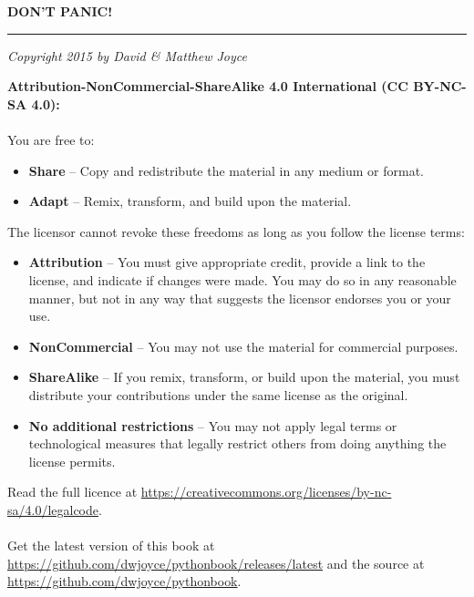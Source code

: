 {
\vspace*{\fill}
\begin{center}
\textbf{\fontsize{50}{50}\selectfont DON'T PANIC!}\\
\hfill\vspace{15pt}
\rule{\linewidth}{1.0mm}\hfill
\vspace{35pt}
\textit{Copyright} \textcopyright\; \textit{2015 by David \& Matthew Joyce}\\
\vspace{20pt}
\end{center}
{\bfseries Attribution-NonCommercial-ShareAlike 4.0 International (CC BY-NC-SA 4.0):}\\~\\
\footnotesize You are free to:
\begin{itemize}
\item {\bfseries Share} -- Copy and redistribute the material in any medium or format.\\
\item {\bfseries Adapt} -- Remix, transform, and build upon the material.\\
\end{itemize}
The licensor cannot revoke these freedoms as long as you follow the license terms:
\begin{itemize}
\item {\bfseries Attribution} -- You must give appropriate credit, provide a link to the license, and indicate if changes were made. You may do so in any reasonable manner, but not in any way that suggests the licensor endorses you or your use.\\
\item {\bfseries NonCommercial} -- You may not use the material for commercial purposes.\\
\item {\bfseries ShareAlike} -- If you remix, transform, or build upon the material, you must distribute your contributions under the same license as the original.\\
\item {\bfseries No additional restrictions} -- You may not apply legal terms or technological measures that legally restrict others from doing anything the license permits.\\
\end{itemize}
Read the full licence at \url{https://creativecommons.org/licenses/by-nc-sa/4.0/legalcode}.\\~\\
Get the latest version of this book at \url{https://github.com/dwjoyce/pythonbook/releases/latest} and the source at \url{https://github.com/dwjoyce/pythonbook}.\\
\vspace*{\fill}
}